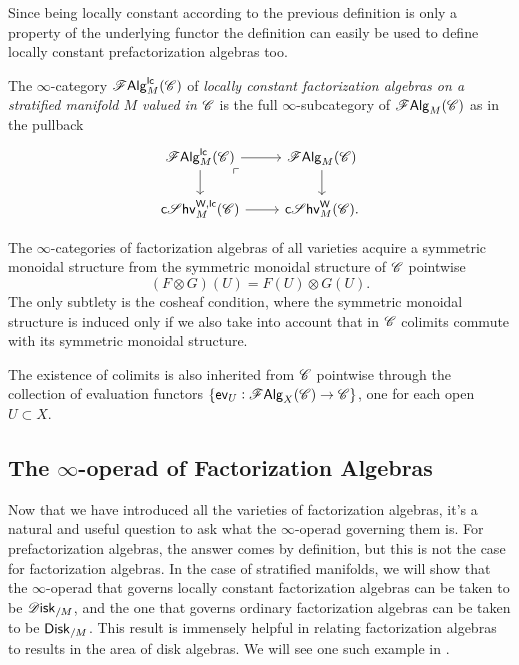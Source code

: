 \documentclass[../text]{subfiles}
\begin{document}
\begin{remark}
    Since being locally constant according to the previous definition is only a property of the underlying functor the definition can easily be used to define locally constant prefactorization algebras too.
\end{remark}

\begin{definition}
    The $\infty$-category $\mathscr{F} \mathsf{Alg}^{\mathsf{lc}}_M (\mathscr{C})$ of \emph{locally constant factorization algebras on a stratified manifold $M$ valued in $\mathscr{C}$} is the full $\infty$-subcategory of $\mathscr{F} \mathsf{Alg}_M (\mathscr{C})$ as in the pullback
    \begin{equation}
        \begin{tikzcd}
            \lcfa_M (\catC) \arrow[dr, phantom, "\ulcorner", very near start] \arrow[r] \arrow[d] & \falg_M (\catC) \arrow[d] \\
            \csheaves[W, lc]_M (\catC) \arrow[r] & \csheaves[W]_M (\catC).
        \end{tikzcd}
    \end{equation}
\end{definition}

\begin{remark}\label{rem:sym_mon_inheritance}
    The $\infty$-categories of factorization algebras of all varieties acquire a symmetric monoidal structure from the symmetric monoidal structure of $\mathscr{C}$ pointwise
    \begin{equation}
        (F \otimes G)(U) = F(U) \otimes G(U).
    \end{equation}
    The only subtlety is the cosheaf condition, where the symmetric monoidal structure is induced only if we also take into account that in $\mathscr{C}$ colimits commute with its symmetric monoidal structure.

    The existence of colimits is also inherited from $\mathscr{C}$ pointwise through the collection of evaluation functors $\{ \mathsf{ev}_U: \mathscr{F} \mathsf{Alg}_X (\mathscr{C}) \rightarrow \mathscr{C} \}$, one for each open $U \subset X$.
\end{remark}



\subsection{The \texorpdfstring{$\infty$-}{infinity }operad of Factorization Algebras}

Now that we have introduced all the varieties of factorization algebras, it's a natural and useful question to ask what the $\infty$-operad governing them is. For prefactorization algebras, the answer comes by definition, but this is not the case for factorization algebras. In the case of stratified manifolds, we will show that the $\infty$-operad that governs locally constant factorization algebras can be taken to be $\disk_{/M}$, and the one that governs ordinary factorization algebras can be taken to be $\disk[r]_{/M}$. This result is immensely helpful in relating factorization algebras to results in the area of disk algebras. We will see one such example in .
\end{document}
